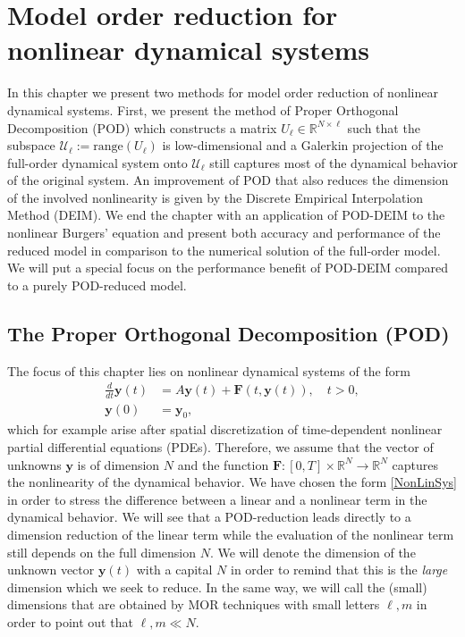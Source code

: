 \chapter{Model order reduction for nonlinear dynamical systems}
\label{MOR_chap}
In this chapter we present two methods for model order reduction of nonlinear dynamical systems. First, we present the method of Proper Orthogonal Decomposition (POD) which constructs a matrix $U_\ell \in \mathbb{R}^{N \times \ell}$ such that the subspace $\mathcal{U}_\ell := \text{range}(U_\ell)$ is low-dimensional and a Galerkin projection of the full-order dynamical system onto $\mathcal{U}_\ell$ still captures most of the dynamical behavior of the original system. An improvement of POD that also reduces the dimension of the involved nonlinearity is given by the Discrete Empirical Interpolation Method (DEIM). We end the chapter with an application of POD-DEIM to the nonlinear Burgers' equation and present both accuracy and performance of the reduced model in comparison to the numerical solution of the full-order model. We will put a special focus on the performance benefit of POD-DEIM compared to a purely POD-reduced model.
\section{The Proper Orthogonal Decomposition (POD)}
The focus of this chapter lies on nonlinear dynamical systems of the form
\begin{align}
 \label{NonLinSys}
 \frac{d}{dt} \mathbf{y}(t) &= A \mathbf{y}(t) + \mathbf{F}(t,\mathbf{y}(t)), \quad t > 0, \\
 \label{NonLinSysIC}
 \mathbf{y}(0) &= \mathbf{y}_0,
\end{align}
which for example arise after spatial discretization of time-dependent nonlinear partial differential equations (PDEs). Therefore, we assume that the vector of unknowns $\mathbf{y}$ is of dimension $N$ and the function $\mathbf{F}:[0,T] \times \mathbb{R}^N \rightarrow \mathbb{R}^N$ captures the nonlinearity of the dynamical behavior. We have chosen the form \eqref{NonLinSys} in order to stress the difference between a linear and a nonlinear term in the dynamical behavior. We will see that a POD-reduction leads directly to a dimension reduction of the linear term while the evaluation of the nonlinear term still depends on the full dimension $N$. We will denote the dimension of the unknown vector $\mathbf{y}(t)$ with a capital $N$ in order to remind that this is the \textit{large} dimension which we seek to reduce. In the same way, we will call the (small) dimensions that are obtained by MOR techniques with small letters $\ell,m$ in order to point out that $\ell,m \ll N$.
